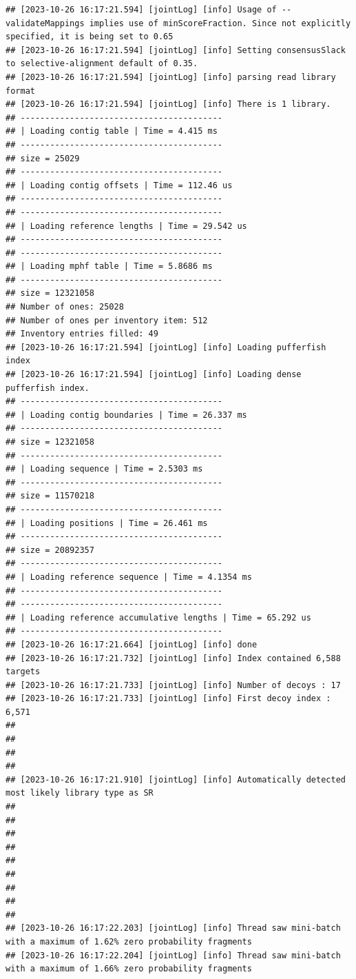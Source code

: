 \documentclass[
]{book}
\begin{document}
\begin{verbatim}
## [2023-10-26 16:17:21.594] [jointLog] [info] Usage of --validateMappings implies use of minScoreFraction. Since not explicitly specified, it is being set to 0.65
## [2023-10-26 16:17:21.594] [jointLog] [info] Setting consensusSlack to selective-alignment default of 0.35.
## [2023-10-26 16:17:21.594] [jointLog] [info] parsing read library format
## [2023-10-26 16:17:21.594] [jointLog] [info] There is 1 library.
## -----------------------------------------
## | Loading contig table | Time = 4.415 ms
## -----------------------------------------
## size = 25029
## -----------------------------------------
## | Loading contig offsets | Time = 112.46 us
## -----------------------------------------
## -----------------------------------------
## | Loading reference lengths | Time = 29.542 us
## -----------------------------------------
## -----------------------------------------
## | Loading mphf table | Time = 5.8686 ms
## -----------------------------------------
## size = 12321058
## Number of ones: 25028
## Number of ones per inventory item: 512
## Inventory entries filled: 49
## [2023-10-26 16:17:21.594] [jointLog] [info] Loading pufferfish index
## [2023-10-26 16:17:21.594] [jointLog] [info] Loading dense pufferfish index.
## -----------------------------------------
## | Loading contig boundaries | Time = 26.337 ms
## -----------------------------------------
## size = 12321058
## -----------------------------------------
## | Loading sequence | Time = 2.5303 ms
## -----------------------------------------
## size = 11570218
## -----------------------------------------
## | Loading positions | Time = 26.461 ms
## -----------------------------------------
## size = 20892357
## -----------------------------------------
## | Loading reference sequence | Time = 4.1354 ms
## -----------------------------------------
## -----------------------------------------
## | Loading reference accumulative lengths | Time = 65.292 us
## -----------------------------------------
## [2023-10-26 16:17:21.664] [jointLog] [info] done
## [2023-10-26 16:17:21.732] [jointLog] [info] Index contained 6,588 targets
## [2023-10-26 16:17:21.733] [jointLog] [info] Number of decoys : 17
## [2023-10-26 16:17:21.733] [jointLog] [info] First decoy index : 6,571 
## 
## 
## 
## 
## [2023-10-26 16:17:21.910] [jointLog] [info] Automatically detected most likely library type as SR
## 
## 
## 
## 
## 
## 
## 
## 
## 
## [2023-10-26 16:17:22.203] [jointLog] [info] Thread saw mini-batch with a maximum of 1.62% zero probability fragments
## [2023-10-26 16:17:22.204] [jointLog] [info] Thread saw mini-batch with a maximum of 1.66% zero probability fragments

\end{verbatim}
\end{document}
